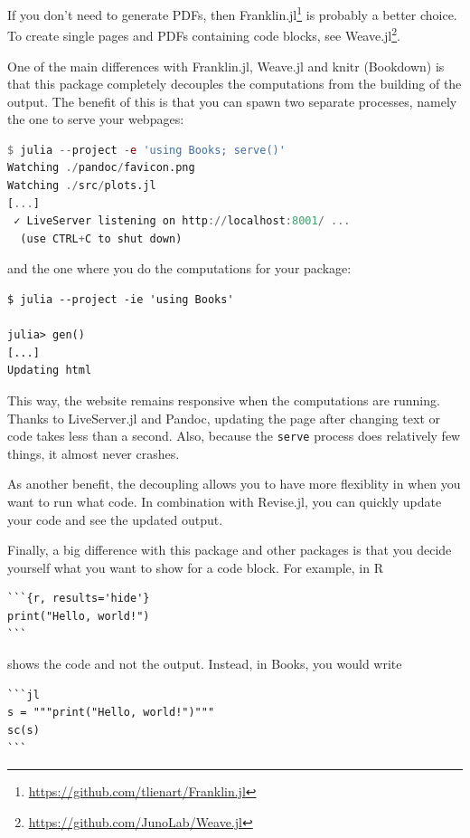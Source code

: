 \documentclass[
  notoc %
]{tufte-book}
\DeclareRobustCommand{\href}[2]{#2\footnote{\url{#1}}}
\newcommand{\passthrough}[1]{#1}
\begin{document}
If you don't need to generate PDFs, then
\href{https://github.com/tlienart/Franklin.jl}{Franklin.jl} is probably
a better choice. To create single pages and PDFs containing code blocks,
see \href{https://github.com/JunoLab/Weave.jl}{Weave.jl}.

One of the main differences with Franklin.jl, Weave.jl and knitr
(Bookdown) is that this package completely decouples the computations
from the building of the output. The benefit of this is that you can
spawn two separate processes, namely the one to serve your webpages:

\begin{lstlisting}[language=Julia]
$ julia --project -e 'using Books; serve()'
Watching ./pandoc/favicon.png
Watching ./src/plots.jl
[...]
 ✓ LiveServer listening on http://localhost:8001/ ...
  (use CTRL+C to shut down)

\end{lstlisting}

and the one where you do the computations for your package:

\begin{lstlisting}
$ julia --project -ie 'using Books'

julia> gen()
[...]
Updating html
\end{lstlisting}

This way, the website remains responsive when the computations are
running. Thanks to LiveServer.jl and Pandoc, updating the page after
changing text or code takes less than a second. Also, because the
\passthrough{\lstinline!serve!} process does relatively few things, it
almost never crashes.

As another benefit, the decoupling allows you to have more flexiblity in
when you want to run what code. In combination with Revise.jl, you can
quickly update your code and see the updated output.

Finally, a big difference with this package and other packages is that
you decide yourself what you want to show for a code block. For example,
in R

\begin{lstlisting}
```{r, results='hide'}
print("Hello, world!")
```
\end{lstlisting}

shows the code and not the output. Instead, in Books, you would write

\begin{lstlisting}
```jl
s = """print("Hello, world!")"""
sc(s)
```
\end{lstlisting}
\end{document}
